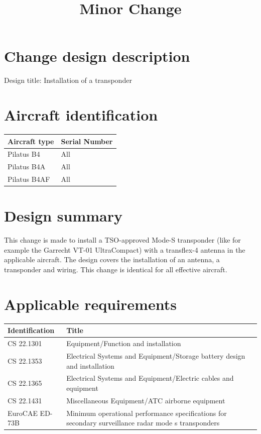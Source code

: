 \documentclass{article}
\begin{document}
\title{Minor Change}
\author{}
\date{}
\maketitle

\section{Change design description}
Design title: Installation of a transponder

\section{Aircraft identification}
\begin{tabular}{|l|l|}
\hline
Aircraft type & Serial Number \\
\hline
Pilatus B4 & All \\
Pilatus B4A & All \\
Pilatus B4AF & All \\
\hline
\end{tabular}

\section{Design summary}
This change is made to install a TSO-approved Mode-S transponder (like for example the Garrecht VT-01 UltraCompact) with a transflex-4 antenna in the applicable aircraft. The design covers the installation of an antenna, a transponder and wiring. This change is identical for all effective aircraft.

\section{Applicable requirements}
\begin{tabular}{|l|p{10cm}|}
\hline
Identification & Title \\
\hline
CS 22.1301 &  Equipment/Function and installation \\
CS 22.1353 &  Electrical Systems and Equipment/Storage battery design and installation \\
CS 22.1365 &  Electrical Systems and Equipment/Electric cables and equipment \\
CS 22.1431 &  Miscellaneous Equipment/ATC airborne equipment \\
EuroCAE ED-73B & Minimum operational performance specifications for secondary surveillance radar mode s transponders \\
\hline
\end{tabular}
\end{document}
